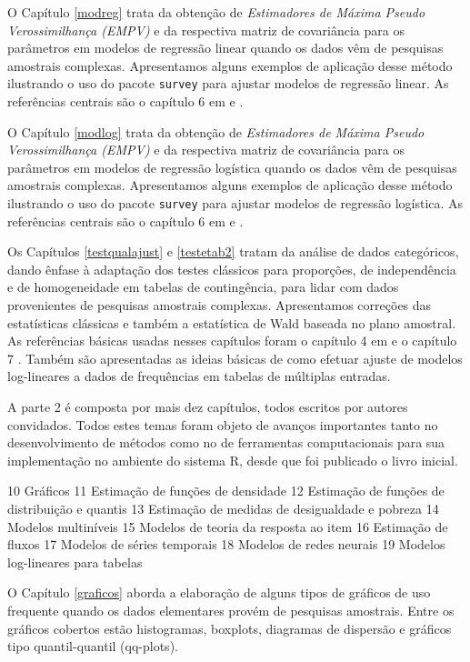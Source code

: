 \documentclass[
]{book}
\begin{document}
O Capítulo \ref{modreg} trata da obtenção de \emph{Estimadores de Máxima Pseudo Verossimilhança (EMPV)} e da respectiva matriz de covariância para os parâmetros em modelos de regressão linear quando os dados vêm de pesquisas amostrais complexas. Apresentamos alguns exemplos de aplicação desse método ilustrando o uso do pacote \texttt{survey} \citep{R-survey} para ajustar modelos de regressão linear. As referências centrais são o capítulo 6 em \citep{Silva} e \citep{binder83}.

O Capítulo \ref{modlog} trata da obtenção de \emph{Estimadores de Máxima Pseudo Verossimilhança (EMPV)} e da respectiva matriz de covariância para os parâmetros em modelos de regressão logística quando os dados vêm de pesquisas amostrais complexas. Apresentamos alguns exemplos de aplicação desse método ilustrando o uso do pacote \texttt{survey} \citep{R-survey} para ajustar modelos de regressão logística. As referências centrais são o capítulo 6 em \citep{Silva} e \citep{binder83}.

Os Capítulos \ref{testqualajust} e \ref{testetab2} tratam da análise de dados
categóricos, dando ênfase à adaptação dos testes clássicos para proporções, de independência e de homogeneidade em tabelas de contingência, para lidar com dados provenientes de pesquisas amostrais complexas. Apresentamos correções das estatísticas clássicas e também a estatística de Wald baseada no plano amostral. As referências básicas usadas nesses capítulos foram o capítulo 4 em \citep{SHS89} e o capítulo 7 \citep{lethonen}. Também são apresentadas as ideias básicas de como efetuar ajuste de modelos log-lineares a dados de frequências em tabelas de múltiplas entradas.

A parte 2 é composta por mais dez capítulos, todos escritos por autores convidados. Todos estes temas foram objeto de avanços importantes tanto no desenvolvimento de métodos como no de ferramentas computacionais para sua implementação no ambiente do sistema R, desde que foi publicado o livro inicial.

10 Gráficos
11 Estimação de funções de densidade
12 Estimação de funções de distribuição e quantis
13 Estimação de medidas de desigualdade e pobreza
14 Modelos multiníveis
15 Modelos de teoria da resposta ao item
16 Estimação de fluxos
17 Modelos de séries temporais
18 Modelos de redes neurais
19 Modelos log-lineares para tabelas

O Capítulo \ref{graficos} aborda a elaboração de alguns tipos de gráficos de uso frequente quando os dados elementares provém de pesquisas amostrais. Entre os gráficos cobertos estão histogramas, boxplots, diagramas de dispersão e gráficos tipo quantil-quantil (qq-plots).
\end{document}
